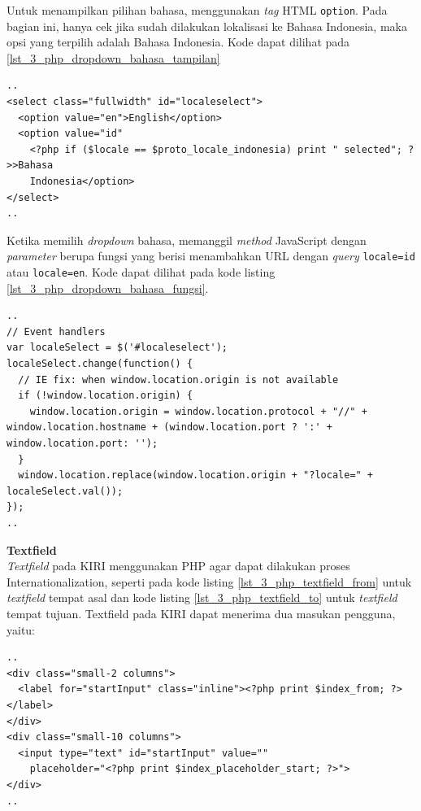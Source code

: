 \documentclass[a4paper,twoside]{article}
\begin{document}
\begin{enumerate}
Untuk menampilkan pilihan bahasa, menggunakan \textit{tag} HTML \verb!option!. Pada bagian ini, hanya cek jika sudah dilakukan lokalisasi ke Bahasa Indonesia, maka opsi yang terpilih adalah Bahasa Indonesia. Kode dapat dilihat pada \ref{lst_3_php_dropdown_bahasa_tampilan}

\begin{lstlisting}[caption=Menampilkan pilihan bahasa kepada pengguna ,label = {lst_3_php_dropdown_bahasa_tampilan}]
..
<select class="fullwidth" id="localeselect">
  <option value="en">English</option>
  <option value="id"
    <?php if ($locale == $proto_locale_indonesia) print " selected"; ?>>Bahasa
    Indonesia</option>
</select>
..
\end{lstlisting}

Ketika memilih \textit{dropdown} bahasa, memanggil \textit{method} JavaScript dengan \textit{parameter} berupa fungsi yang berisi menambahkan URL dengan \textit{query} \verb!locale=id! atau \verb!locale=en!. Kode dapat dilihat pada kode listing \ref{lst_3_php_dropdown_bahasa_fungsi}.

\begin{lstlisting}[caption=Fungsi JavaScript untuk Internationalization ,label = {lst_3_php_dropdown_bahasa_fungsi}]
..
// Event handlers
var localeSelect = $('#localeselect');
localeSelect.change(function() {
  // IE fix: when window.location.origin is not available 
  if (!window.location.origin) {
    window.location.origin = window.location.protocol + "//" + window.location.hostname + (window.location.port ? ':' + window.location.port: '');
  }
  window.location.replace(window.location.origin + "?locale=" + localeSelect.val());
});
..
\end{lstlisting}


\textbf{Textfield}\\
\textit{Textfield} pada KIRI menggunakan PHP agar dapat dilakukan proses Internationalization, seperti pada kode listing \ref{lst_3_php_textfield_from} untuk \textit{textfield} tempat asal dan kode listing \ref{lst_3_php_textfield_to} untuk \textit{textfield} tempat tujuan. Textfield pada KIRI dapat menerima dua masukan pengguna, yaitu:

\begin{lstlisting}[caption=Menampilkan \textit{textfield} tempat awal kepada pengguna ,label = {lst_3_php_textfield_from}]
..
<div class="small-2 columns">
  <label for="startInput" class="inline"><?php print $index_from; ?></label>
</div>
<div class="small-10 columns">
  <input type="text" id="startInput" value=""
    placeholder="<?php print $index_placeholder_start; ?>">
</div>
..
\end{lstlisting}


\end{enumerate}
\end{document}
